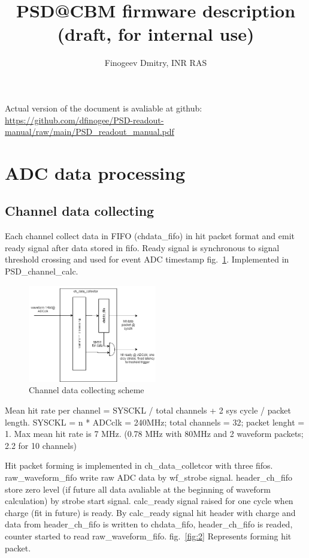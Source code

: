 \documentclass{article}
\title{PSD@CBM firmware description (draft, for internal use)}
\author{Finogeev Dmitry, INR RAS}
\begin{document}
\maketitle

Actual version of the document is avaliable at github:
\newline
\url{https://github.com/dfinogee/PSD-readout-manual/raw/main/PSD_readout_manual.pdf}



\tableofcontents

\newpage

\section{ADC data processing}

\subsection{Channel data collecting}
Each channel collect data in FIFO (chdata\_fifo) in hit packet format and emit ready signal after data stored in fifo. Ready signal is synchronous to signal threshold crossing and used for event ADC timestamp fig.~\ref{fig:1}. Implemented in PSD\_channel\_calc.

\begin{figure}[H]
	\centering 
	\includegraphics[width=0.5\textwidth]{ADC_event_collection.png}
	\caption{\label{fig:1} Channel data collecting scheme}
\end{figure}
Mean hit rate per channel = SYSCKL / total channels + 2 sys cycle / packet length. SYSCKL = n * ADCclk = 240MHz; total channels = 32; packet lenght = 1. Max mean hit rate is 7 MHz. (0.78 MHz with 80MHz and 2 waveform packets; 2.2 for 10 channels)


Hit packet forming is implemented in ch\_data\_colletcor with three fifos. raw\_waveform\_fifo write raw ADC data by wf\_strobe signal. header\_ch\_fifo store zero level (if future all data avaliable at the beginning of waveform calculation) by strobe start signal. calc\_ready signal raised for one cycle when charge (fit in future) is ready. By calc\_ready signal hit header with charge and data from header\_ch\_fifo is written to chdata\_fifo, header\_ch\_fifo is readed, counter started to read raw\_waveform\_fifo. fig.~\ref{fig:2} Represents forming hit packet.
\end{document}
